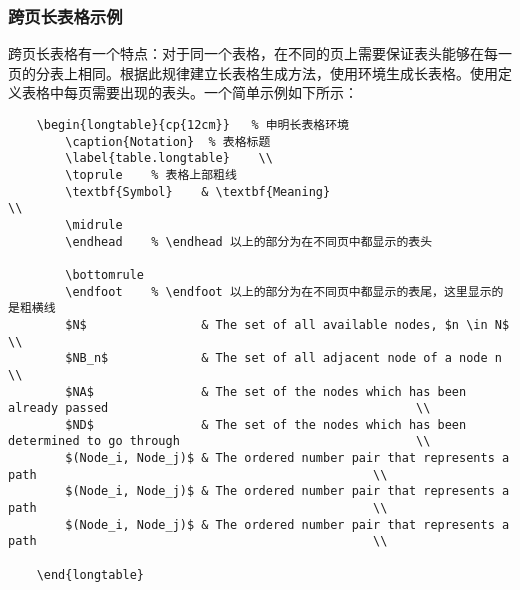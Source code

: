 \documentclass{nitthesis}
\begin{document}
\subsubsection{跨页长表格示例}

跨页长表格有一个特点：对于同一个表格，在不同的页上需要保证表头能够在每一页的分表上相同。根据此规律建立长表格生成方法，使用环境生成长表格。使用定义表格中每页需要出现的表头。一个简单示例如下所示：

\linespread{1}
\begin{lstlisting}
    \begin{longtable}{cp{12cm}}   % 申明长表格环境
        \caption{Notation}  % 表格标题
        \label{table.longtable}    \\
        \toprule    % 表格上部粗线
        \textbf{Symbol}    & \textbf{Meaning}                                                                             \\
        \midrule
        \endhead    % \endhead 以上的部分为在不同页中都显示的表头
        
        \bottomrule 
        \endfoot    % \endfoot 以上的部分为在不同页中都显示的表尾，这里显示的是粗横线
        $N$                & The set of all available nodes, $n \in N$                                                    \\
        $NB_n$             & The set of all adjacent node of a node n                                                     \\
        $NA$               & The set of the nodes which has been already passed                                           \\
        $ND$               & The set of the nodes which has been determined to go through                                 \\
        $(Node_i, Node_j)$ & The ordered number pair that represents a path                                               \\
        $(Node_i, Node_j)$ & The ordered number pair that represents a path                                               \\
        $(Node_i, Node_j)$ & The ordered number pair that represents a path                                               \\

    \end{longtable}
\end{lstlisting}
\linespread{1.5}
\end{document}
